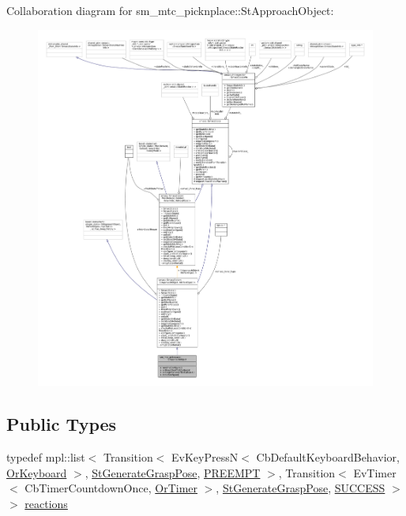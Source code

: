 Collaboration diagram for sm\+\_\+mtc\+\_\+picknplace\+:\+:St\+Approach\+Object\+:
\nopagebreak
\begin{figure}[H]
\begin{center}
\leavevmode
\includegraphics[width=350pt]{structsm__mtc__picknplace_1_1StApproachObject__coll__graph}
\end{center}
\end{figure}
\subsection*{Public Types}
\begin{DoxyCompactItemize}
\item 
typedef mpl\+::list$<$ Transition$<$ Ev\+Key\+PressN$<$ Cb\+Default\+Keyboard\+Behavior, \hyperlink{classsm__mtc__picknplace_1_1OrKeyboard}{Or\+Keyboard} $>$, \hyperlink{structsm__mtc__picknplace_1_1StGenerateGraspPose}{St\+Generate\+Grasp\+Pose}, \hyperlink{classPREEMPT}{P\+R\+E\+E\+M\+PT} $>$, Transition$<$ Ev\+Timer$<$ Cb\+Timer\+Countdown\+Once, \hyperlink{classsm__mtc__picknplace_1_1OrTimer}{Or\+Timer} $>$, \hyperlink{structsm__mtc__picknplace_1_1StGenerateGraspPose}{St\+Generate\+Grasp\+Pose}, \hyperlink{classSUCCESS}{S\+U\+C\+C\+E\+SS} $>$ $>$ \hyperlink{structsm__mtc__picknplace_1_1StApproachObject_a9828fec00f78add92fa9cdbdeb14a0c9}{reactions}
\end{DoxyCompactItemize}
